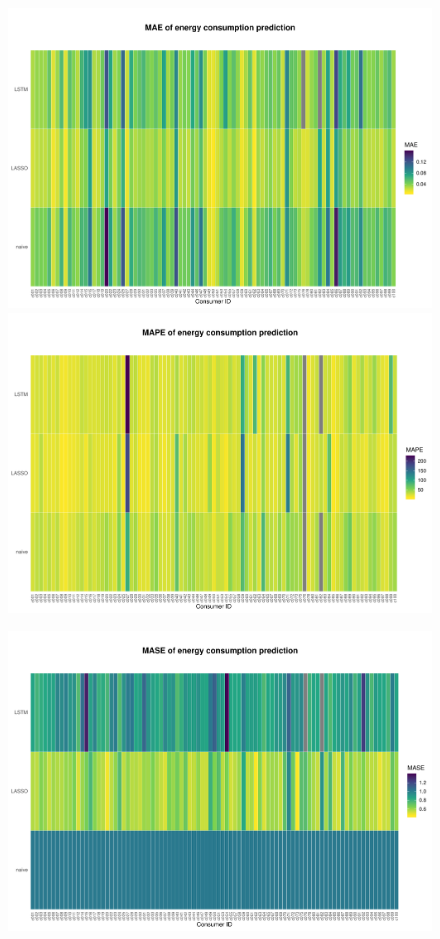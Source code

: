 \begin{centering}
\begin{figure}[H]
    \includegraphics[width=\textwidth]{thesis/graphs/evaluation/c_heatmap_MAE.pdf}
    \includegraphics[width=\textwidth]{thesis/graphs/evaluation/c_heatmap_MAPE.pdf}
\end{figure}
\begin{figure}[H]
     \includegraphics[width=\textwidth]{thesis/graphs/evaluation/c_heatmap_MASE.pdf}

\end{figure}
\end{centering}
